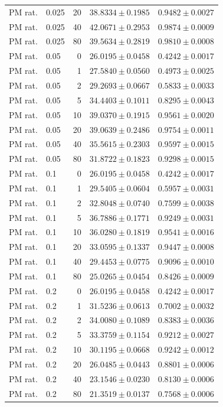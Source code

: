 \begin{longtable}{llrll}
PM rat. & 0.025 & 20 & $38.8334 \pm 0.1985$ & $0.9482 \pm 0.0027$ \\
PM rat. & 0.025 & 40 & $42.0671 \pm 0.2953$ & $0.9874 \pm 0.0009$ \\
PM rat. & 0.025 & 80 & $39.5634 \pm 0.2819$ & $0.9810 \pm 0.0008$ \\
PM rat. & 0.05 & 0 & $26.0195 \pm 0.0458$ & $0.4242 \pm 0.0017$ \\
PM rat. & 0.05 & 1 & $27.5840 \pm 0.0560$ & $0.4973 \pm 0.0025$ \\
PM rat. & 0.05 & 2 & $29.2693 \pm 0.0667$ & $0.5833 \pm 0.0033$ \\
PM rat. & 0.05 & 5 & $34.4403 \pm 0.1011$ & $0.8295 \pm 0.0043$ \\
PM rat. & 0.05 & 10 & $39.0370 \pm 0.1915$ & $0.9561 \pm 0.0020$ \\
PM rat. & 0.05 & 20 & $39.0639 \pm 0.2486$ & $0.9754 \pm 0.0011$ \\
PM rat. & 0.05 & 40 & $35.5615 \pm 0.2303$ & $0.9597 \pm 0.0015$ \\
PM rat. & 0.05 & 80 & $31.8722 \pm 0.1823$ & $0.9298 \pm 0.0015$ \\
PM rat. & 0.1 & 0 & $26.0195 \pm 0.0458$ & $0.4242 \pm 0.0017$ \\
PM rat. & 0.1 & 1 & $29.5405 \pm 0.0604$ & $0.5957 \pm 0.0031$ \\
PM rat. & 0.1 & 2 & $32.8048 \pm 0.0740$ & $0.7599 \pm 0.0038$ \\
PM rat. & 0.1 & 5 & $36.7886 \pm 0.1771$ & $0.9249 \pm 0.0031$ \\
PM rat. & 0.1 & 10 & $36.0280 \pm 0.1819$ & $0.9541 \pm 0.0016$ \\
PM rat. & 0.1 & 20 & $33.0595 \pm 0.1337$ & $0.9447 \pm 0.0008$ \\
PM rat. & 0.1 & 40 & $29.4453 \pm 0.0775$ & $0.9096 \pm 0.0010$ \\
PM rat. & 0.1 & 80 & $25.0265 \pm 0.0454$ & $0.8426 \pm 0.0009$ \\
PM rat. & 0.2 & 0 & $26.0195 \pm 0.0458$ & $0.4242 \pm 0.0017$ \\
PM rat. & 0.2 & 1 & $31.5236 \pm 0.0613$ & $0.7002 \pm 0.0032$ \\
PM rat. & 0.2 & 2 & $34.0080 \pm 0.1089$ & $0.8383 \pm 0.0036$ \\
PM rat. & 0.2 & 5 & $33.3759 \pm 0.1154$ & $0.9212 \pm 0.0027$ \\
PM rat. & 0.2 & 10 & $30.1195 \pm 0.0668$ & $0.9242 \pm 0.0012$ \\
PM rat. & 0.2 & 20 & $26.0485 \pm 0.0443$ & $0.8801 \pm 0.0006$ \\
PM rat. & 0.2 & 40 & $23.1546 \pm 0.0230$ & $0.8130 \pm 0.0006$ \\
PM rat. & 0.2 & 80 & $21.3519 \pm 0.0137$ & $0.7568 \pm 0.0006$ \\
\end{longtable}


